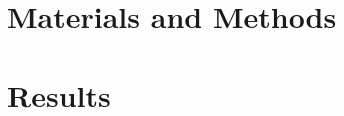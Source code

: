 \documentclass[journal,compsoc]{IEEEtran}
\begin{document}
\maketitle





\section{Materials and Methods}
\label{sec:methods}








\section{Results}
\label{sec:results}













\end{document}
